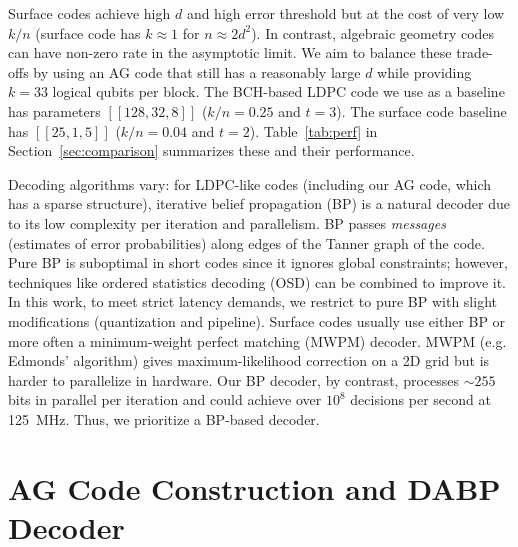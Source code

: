 \documentclass[conference]{IEEEtran}  %
\begin{document}
Surface codes achieve high $d$ and high error threshold but at the cost of very low $k/n$ (surface code has $k\approx 1$ for $n\approx 2d^2$). In contrast, algebraic geometry codes can have non-zero rate in the asymptotic limit. We aim to balance these trade-offs by using an AG code that still has a reasonably large $d$ while providing $k=33$ logical qubits per block. The BCH-based LDPC code we use as a baseline has parameters $[[128,32,8]]$ ($k/n=0.25$ and $t=3$). The surface code baseline has $[[25,1,5]]$ ($k/n=0.04$ and $t=2$). Table~\ref{tab:perf} in Section~\ref{sec:comparison} summarizes these and their performance.

Decoding algorithms vary: for LDPC-like codes (including our AG code, which has a sparse structure), iterative belief propagation (BP) is a natural decoder due to its low complexity per iteration and parallelism. BP passes \emph{messages} (estimates of error probabilities) along edges of the Tanner graph of the code. Pure BP is suboptimal in short codes since it ignores global constraints; however, techniques like ordered statistics decoding (OSD) can be combined to improve it. In this work, to meet strict latency demands, we restrict to pure BP with slight modifications (quantization and pipeline). Surface codes usually use either BP or more often a minimum-weight perfect matching (MWPM) decoder. MWPM (e.g. Edmonds' algorithm) gives maximum-likelihood correction on a 2D grid but is harder to parallelize in hardware. Our BP decoder, by contrast, processes $\sim255$ bits in parallel per iteration and could achieve over $10^8$ decisions per second at 125~MHz. Thus, we prioritize a BP-based decoder.

\section{AG Code Construction and DABP Decoder}\label{sec:code_decoder}
\end{document}
